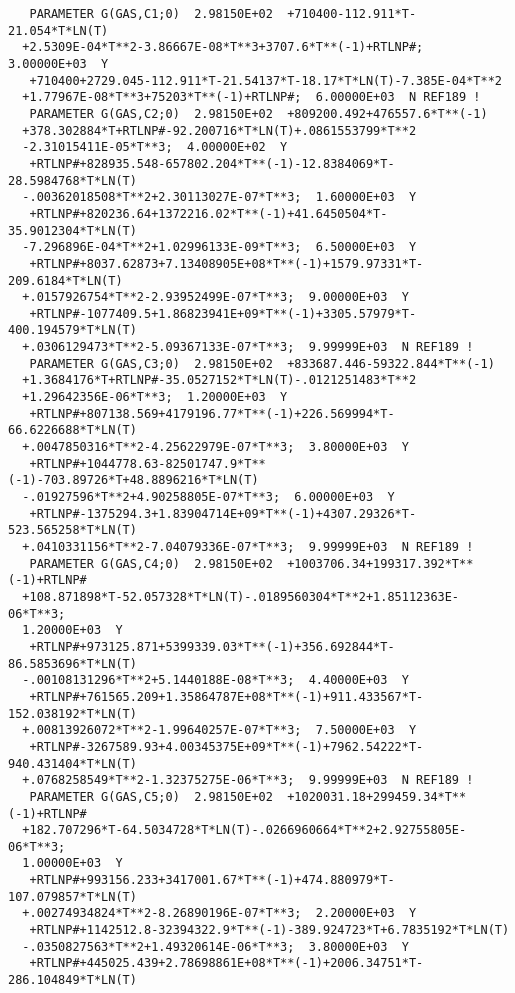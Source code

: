 \documentclass[12pt]{article}
\begin{document}
\begin{verbatim}
   PARAMETER G(GAS,C1;0)  2.98150E+02  +710400-112.911*T-21.054*T*LN(T)
  +2.5309E-04*T**2-3.86667E-08*T**3+3707.6*T**(-1)+RTLNP#;  3.00000E+03  Y
   +710400+2729.045-112.911*T-21.54137*T-18.17*T*LN(T)-7.385E-04*T**2
  +1.77967E-08*T**3+75203*T**(-1)+RTLNP#;  6.00000E+03  N REF189 !
   PARAMETER G(GAS,C2;0)  2.98150E+02  +809200.492+476557.6*T**(-1)
  +378.302884*T+RTLNP#-92.200716*T*LN(T)+.0861553799*T**2
  -2.31015411E-05*T**3;  4.00000E+02  Y
   +RTLNP#+828935.548-657802.204*T**(-1)-12.8384069*T-28.5984768*T*LN(T)
  -.00362018508*T**2+2.30113027E-07*T**3;  1.60000E+03  Y
   +RTLNP#+820236.64+1372216.02*T**(-1)+41.6450504*T-35.9012304*T*LN(T)
  -7.296896E-04*T**2+1.02996133E-09*T**3;  6.50000E+03  Y
   +RTLNP#+8037.62873+7.13408905E+08*T**(-1)+1579.97331*T-209.6184*T*LN(T)
  +.0157926754*T**2-2.93952499E-07*T**3;  9.00000E+03  Y
   +RTLNP#-1077409.5+1.86823941E+09*T**(-1)+3305.57979*T-400.194579*T*LN(T)
  +.0306129473*T**2-5.09367133E-07*T**3;  9.99999E+03  N REF189 !
   PARAMETER G(GAS,C3;0)  2.98150E+02  +833687.446-59322.844*T**(-1)
  +1.3684176*T+RTLNP#-35.0527152*T*LN(T)-.0121251483*T**2
  +1.29642356E-06*T**3;  1.20000E+03  Y
   +RTLNP#+807138.569+4179196.77*T**(-1)+226.569994*T-66.6226688*T*LN(T)
  +.0047850316*T**2-4.25622979E-07*T**3;  3.80000E+03  Y
   +RTLNP#+1044778.63-82501747.9*T**(-1)-703.89726*T+48.8896216*T*LN(T)
  -.01927596*T**2+4.90258805E-07*T**3;  6.00000E+03  Y
   +RTLNP#-1375294.3+1.83904714E+09*T**(-1)+4307.29326*T-523.565258*T*LN(T)
  +.0410331156*T**2-7.04079336E-07*T**3;  9.99999E+03  N REF189 !
   PARAMETER G(GAS,C4;0)  2.98150E+02  +1003706.34+199317.392*T**(-1)+RTLNP#
  +108.871898*T-52.057328*T*LN(T)-.0189560304*T**2+1.85112363E-06*T**3;  
  1.20000E+03  Y
   +RTLNP#+973125.871+5399339.03*T**(-1)+356.692844*T-86.5853696*T*LN(T)
  -.00108131296*T**2+5.1440188E-08*T**3;  4.40000E+03  Y
   +RTLNP#+761565.209+1.35864787E+08*T**(-1)+911.433567*T-152.038192*T*LN(T)
  +.00813926072*T**2-1.99640257E-07*T**3;  7.50000E+03  Y
   +RTLNP#-3267589.93+4.00345375E+09*T**(-1)+7962.54222*T-940.431404*T*LN(T)
  +.0768258549*T**2-1.32375275E-06*T**3;  9.99999E+03  N REF189 !
   PARAMETER G(GAS,C5;0)  2.98150E+02  +1020031.18+299459.34*T**(-1)+RTLNP#
  +182.707296*T-64.5034728*T*LN(T)-.0266960664*T**2+2.92755805E-06*T**3;  
  1.00000E+03  Y
   +RTLNP#+993156.233+3417001.67*T**(-1)+474.880979*T-107.079857*T*LN(T)
  +.00274934824*T**2-8.26890196E-07*T**3;  2.20000E+03  Y
   +RTLNP#+1142512.8-32394322.9*T**(-1)-389.924723*T+6.7835192*T*LN(T)
  -.0350827563*T**2+1.49320614E-06*T**3;  3.80000E+03  Y
   +RTLNP#+445025.439+2.78698861E+08*T**(-1)+2006.34751*T-286.104849*T*LN(T)

\end{verbatim}
\end{document}
